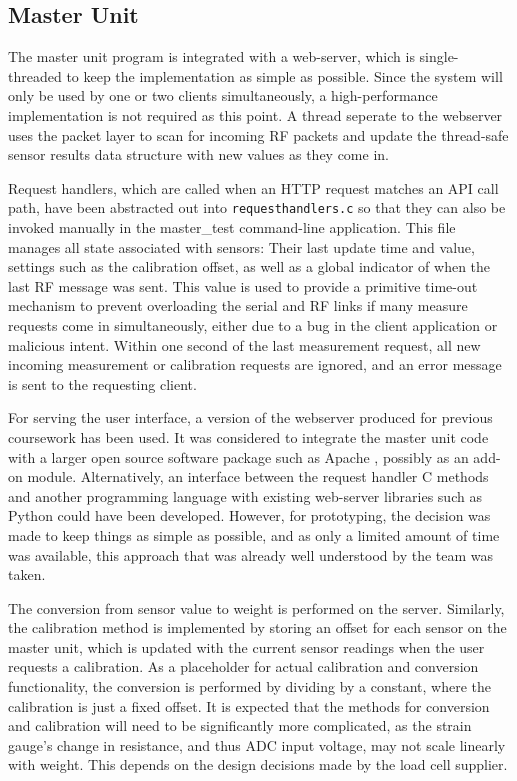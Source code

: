 \subsection{Master Unit}
The master unit program is integrated with a web-server, which is single-threaded to keep the implementation as simple as possible. Since the system will only be used by one or two clients simultaneously, a high-performance implementation is not required as this point. A thread seperate to the webserver uses the packet layer to scan for incoming RF packets and update the thread-safe sensor results data structure with new values as they come in.

Request handlers, which are called when an HTTP request matches an API call path, have been abstracted out into \texttt{requesthandlers.c} so that they can also be invoked manually in the master\_test command-line application. This file manages all state associated with sensors: Their last update time and value, settings such as the calibration offset, as well as a global indicator of when the last RF message was sent. This value is used to provide a primitive time-out mechanism to prevent overloading the serial and RF links if many measure requests come in simultaneously, either due to a bug in the client application or malicious intent. Within one second of the last measurement request, all new incoming measurement or calibration requests are ignored, and an error message is sent to the requesting client.

For serving the user interface, a version of the webserver produced for previous coursework\cite{ns3-coursework} has been used. It was considered to integrate the master unit code with a larger open source software package such as Apache \cite{apache}, possibly as an add-on module. Alternatively, an interface between the request handler C methods and another programming language with existing web-server libraries such as Python could have been developed. However, for prototyping, the decision was made to keep things as simple as possible, and as only a limited amount of time was available, this approach that was already well understood by the team was taken.

The conversion from sensor value to weight is performed on the server. Similarly, the calibration method is implemented by storing an offset for each sensor on the master unit, which is updated with the current sensor readings when the user requests a calibration. As a placeholder for actual calibration and conversion functionality, the conversion is performed by dividing by a constant, where the calibration is just a fixed offset. It is expected that the methods for conversion and calibration will need to be significantly more complicated, as the strain gauge's change in resistance, and thus ADC input voltage, may not scale linearly with weight. This depends on the design decisions made by the load cell supplier.

